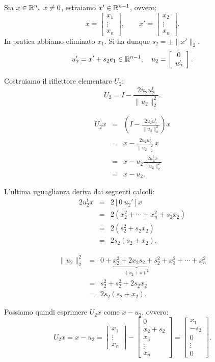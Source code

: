 Sia $x \in \mathbb{R}^n, \ x \neq 0$, estraiamo $x' \in \mathbb{R}^{n-1}$, ovvero:
\[
x = \left[
\begin{array}{c}
x_1 \\
\vdots \\
x_n
\end{array}\right], \qquad
x' =
\left[
\begin{array}{c}
x_2 \\
\vdots \\
x_n
\end{array}\right].
\]
In pratica abbiamo eliminato $x_1$. Si ha dunque $s_2 =\pm \|x'\|_2$.
\[u_2' = x' + s_2e_1 \in \mathbb{R}^{n-1}, \quad u_2 =
\left[
\begin{array}{c}
0 \\
u_2'
\end{array}\right].\]

Costruiamo il riflettore elementare $U_2$:
\[U_2 = I - \frac{2u_2u_2^t}{\| u_2 \|_2^2}.\]

\[
\begin{array}{lcl}
 U_2x & = & \left(I - \frac{2u_2u_2^t}{\| u_2 \|_2^2}\right)x \\
 & = & x - \frac{2u_2u_2^t}{\| u_2 \|_2^2}x \\
 & = & x - u_2\frac{2u_2^tx}{\| u_2 \|_2^2} \\
 & = & x - u_2.
 \end{array}
\]

L'ultima uguaglianza deriva dai seguenti calcoli:
\[
 \begin{array}{lcl}
 2u_2^tx & = & 2[0\  u_2']x \\
       & = & 2(x_2^2 + \cdots + x_n^2 + s_2x_2) \\
       & = & 2(s_2^2 + s_2x_2) \\
       & = & 2s_2(s_2 + x_2),
 \end{array}
\]

\[
 \begin{array}{lcl}
 \|u_2\|_2^2 & = & 0 + \underbrace{x_2^2+2x_2s_2+s_2^2}_{(x_2 + s)^2} + x_3^2 +
                  \cdots + x_n^2 \\
          & = & s_2^2 + s_2^2 +2s_2x_2 \\
          & = & 2s_2(s_2 + x_2).
 \end{array}
\]

Possiamo quindi esprimere $U_2x$ come $ x - u_2$, ovvero:
\[U_2x = x - u_2 =
\left[
\begin{array}{c}
x_1 \\
\vdots \\
x_n
\end{array}\right] -
\left[
\begin{array}{c}
0 \\
x_2 + s_2\\
x_3 \\
\vdots \\
x_n
\end{array}\right] =
\left[
\begin{array}{c}
x_1 \\
-s_2 \\
0 \\
\vdots \\
0
\end{array}\right].
\]

